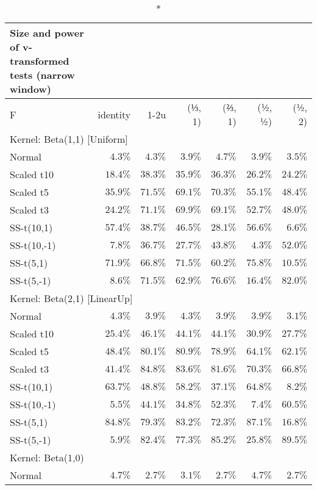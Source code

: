 \setlength{\LTpost}{0mm}
\begin{longtable}{lrrrrrr}
\caption*{
{\large Size and power of v-transformed tests (narrow window)}
} \\ 
\toprule
F & identity & \textbar{}1-2u\textbar{} & (⅓, 1) & (⅔, 1) & (½, ½) & (½, 2) \\ 
\midrule
\multicolumn{7}{l}{Kernel: Beta(1,1) [Uniform]} \\ 
\midrule
Normal & $4.3\%$ & $4.3\%$ & $3.9\%$ & $4.7\%$ & $3.9\%$ & $3.5\%$ \\ 
Scaled t10 & $18.4\%$ & $38.3\%$ & $35.9\%$ & $36.3\%$ & $26.2\%$ & $24.2\%$ \\ 
Scaled t5 & $35.9\%$ & $71.5\%$ & $69.1\%$ & $70.3\%$ & $55.1\%$ & $48.4\%$ \\ 
Scaled t3 & $24.2\%$ & $71.1\%$ & $69.9\%$ & $69.1\%$ & $52.7\%$ & $48.0\%$ \\ 
SS-t(10,1) & $57.4\%$ & $38.7\%$ & $46.5\%$ & $28.1\%$ & $56.6\%$ & $6.6\%$ \\ 
SS-t(10,-1) & $7.8\%$ & $36.7\%$ & $27.7\%$ & $43.8\%$ & $4.3\%$ & $52.0\%$ \\ 
SS-t(5,1) & $71.9\%$ & $66.8\%$ & $71.5\%$ & $60.2\%$ & $75.8\%$ & $10.5\%$ \\ 
SS-t(5,-1) & $8.6\%$ & $71.5\%$ & $62.9\%$ & $76.6\%$ & $16.4\%$ & $82.0\%$ \\ 
\midrule
\multicolumn{7}{l}{Kernel: Beta(2,1) [LinearUp]} \\ 
\midrule
Normal & $4.3\%$ & $3.9\%$ & $4.3\%$ & $3.9\%$ & $3.9\%$ & $3.1\%$ \\ 
Scaled t10 & $25.4\%$ & $46.1\%$ & $44.1\%$ & $44.1\%$ & $30.9\%$ & $27.7\%$ \\ 
Scaled t5 & $48.4\%$ & $80.1\%$ & $80.9\%$ & $78.9\%$ & $64.1\%$ & $62.1\%$ \\ 
Scaled t3 & $41.4\%$ & $84.8\%$ & $83.6\%$ & $81.6\%$ & $70.3\%$ & $66.8\%$ \\ 
SS-t(10,1) & $63.7\%$ & $48.8\%$ & $58.2\%$ & $37.1\%$ & $64.8\%$ & $8.2\%$ \\ 
SS-t(10,-1) & $5.5\%$ & $44.1\%$ & $34.8\%$ & $52.3\%$ & $7.4\%$ & $60.5\%$ \\ 
SS-t(5,1) & $84.8\%$ & $79.3\%$ & $83.2\%$ & $72.3\%$ & $87.1\%$ & $16.8\%$ \\ 
SS-t(5,-1) & $5.9\%$ & $82.4\%$ & $77.3\%$ & $85.2\%$ & $25.8\%$ & $89.5\%$ \\ 
\midrule
\multicolumn{7}{l}{Kernel: Beta(1,0)} \\ 
\midrule
Normal & $4.7\%$ & $2.7\%$ & $3.1\%$ & $2.7\%$ & $4.7\%$ & $2.7\%$ \\ 

\end{longtable}
